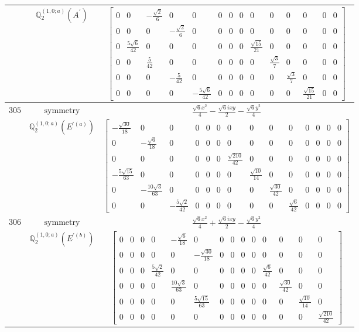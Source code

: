 \documentclass[fleqn,8pt,landscape]{jsarticle}
\begin{document}
\begin{longtable}{ccc}
$  $ & $ \mathbb{Q}_{2}^{(1,0;a)}(A^{\prime}) $ & $ \begin{bmatrix} 0 & 0 & - \frac{\sqrt{2}}{6} & 0 & 0 & 0 & 0 & 0 & 0 & 0 & 0 & 0 & 0 & 0 \\ 0 & 0 & 0 & - \frac{\sqrt{2}}{6} & 0 & 0 & 0 & 0 & 0 & 0 & 0 & 0 & 0 & 0 \\ 0 & \frac{5 \sqrt{6}}{42} & 0 & 0 & 0 & 0 & 0 & 0 & \frac{\sqrt{15}}{21} & 0 & 0 & 0 & 0 & 0 \\ 0 & 0 & \frac{5}{42} & 0 & 0 & 0 & 0 & 0 & 0 & \frac{\sqrt{3}}{7} & 0 & 0 & 0 & 0 \\ 0 & 0 & 0 & - \frac{5}{42} & 0 & 0 & 0 & 0 & 0 & 0 & \frac{\sqrt{3}}{7} & 0 & 0 & 0 \\ 0 & 0 & 0 & 0 & - \frac{5 \sqrt{6}}{42} & 0 & 0 & 0 & 0 & 0 & 0 & \frac{\sqrt{15}}{21} & 0 & 0 \end{bmatrix} $ \\ \hline
$ 305 $ & $ \text{symmetry} $ & $ \frac{\sqrt{6} x^{2}}{4} - \frac{\sqrt{6} i x y}{2} - \frac{\sqrt{6} y^{2}}{4} $ \\
$  $ & $ \mathbb{Q}_{2}^{(1,0;a)}(E^{\prime(a)}) $ & $ \begin{bmatrix} - \frac{\sqrt{30}}{18} & 0 & 0 & 0 & 0 & 0 & 0 & 0 & 0 & 0 & 0 & 0 & 0 & 0 \\ 0 & - \frac{\sqrt{6}}{18} & 0 & 0 & 0 & 0 & 0 & 0 & 0 & 0 & 0 & 0 & 0 & 0 \\ 0 & 0 & 0 & 0 & 0 & 0 & \frac{\sqrt{210}}{42} & 0 & 0 & 0 & 0 & 0 & 0 & 0 \\ - \frac{5 \sqrt{15}}{63} & 0 & 0 & 0 & 0 & 0 & 0 & \frac{\sqrt{10}}{14} & 0 & 0 & 0 & 0 & 0 & 0 \\ 0 & - \frac{10 \sqrt{3}}{63} & 0 & 0 & 0 & 0 & 0 & 0 & \frac{\sqrt{30}}{42} & 0 & 0 & 0 & 0 & 0 \\ 0 & 0 & - \frac{5 \sqrt{2}}{42} & 0 & 0 & 0 & 0 & 0 & 0 & \frac{\sqrt{6}}{42} & 0 & 0 & 0 & 0 \end{bmatrix} $ \\ \hline
$ 306 $ & $ \text{symmetry} $ & $ \frac{\sqrt{6} x^{2}}{4} + \frac{\sqrt{6} i x y}{2} - \frac{\sqrt{6} y^{2}}{4} $ \\
$  $ & $ \mathbb{Q}_{2}^{(1,0;a)}(E^{\prime(b)}) $ & $ \begin{bmatrix} 0 & 0 & 0 & 0 & - \frac{\sqrt{6}}{18} & 0 & 0 & 0 & 0 & 0 & 0 & 0 & 0 & 0 \\ 0 & 0 & 0 & 0 & 0 & - \frac{\sqrt{30}}{18} & 0 & 0 & 0 & 0 & 0 & 0 & 0 & 0 \\ 0 & 0 & 0 & \frac{5 \sqrt{2}}{42} & 0 & 0 & 0 & 0 & 0 & 0 & \frac{\sqrt{6}}{42} & 0 & 0 & 0 \\ 0 & 0 & 0 & 0 & \frac{10 \sqrt{3}}{63} & 0 & 0 & 0 & 0 & 0 & 0 & \frac{\sqrt{30}}{42} & 0 & 0 \\ 0 & 0 & 0 & 0 & 0 & \frac{5 \sqrt{15}}{63} & 0 & 0 & 0 & 0 & 0 & 0 & \frac{\sqrt{10}}{14} & 0 \\ 0 & 0 & 0 & 0 & 0 & 0 & 0 & 0 & 0 & 0 & 0 & 0 & 0 & \frac{\sqrt{210}}{42} \end{bmatrix} $ \\ \hline

\end{longtable}
\end{document}
